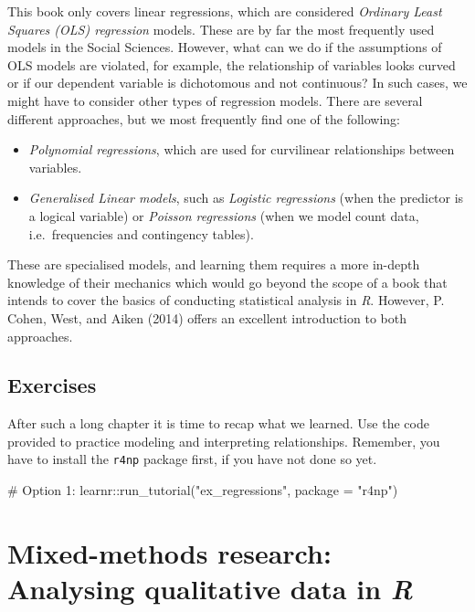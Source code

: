 \documentclass[
  letterpaper,
]{krantz}
\makeatletter
\newenvironment{Shaded}{\begin{snugshade}}{\end{snugshade}}
\newcommand{\AttributeTok}[1]{\textcolor[rgb]{0.40,0.45,0.13}{#1}}
\newcommand{\CommentTok}[1]{\textcolor[rgb]{0.37,0.37,0.37}{#1}}
\newcommand{\FunctionTok}[1]{\textcolor[rgb]{0.28,0.35,0.67}{#1}}
\newcommand{\NormalTok}[1]{\textcolor[rgb]{0.00,0.23,0.31}{#1}}
\newcommand{\SpecialCharTok}[1]{\textcolor[rgb]{0.37,0.37,0.37}{#1}}
\newcommand{\StringTok}[1]{\textcolor[rgb]{0.13,0.47,0.30}{#1}}
\newenvironment{kframe}{%
\medskip{}
\setlength{\fboxsep}{.8em}
 \def\at@end@of@kframe{}%
 \ifinner\ifhmode%
  \def\at@end@of@kframe{\end{minipage}}%
  \begin{minipage}{\columnwidth}%
 \fi\fi%
 \def\FrameCommand##1{\hskip\@totalleftmargin \hskip-\fboxsep
 \colorbox{shadecolor}{##1}\hskip-\fboxsep
     \hskip-\linewidth \hskip-\@totalleftmargin \hskip\columnwidth}%
 \MakeFramed {\advance\hsize-\width
   \@totalleftmargin\z@ \linewidth\hsize
   \@setminipage}}%
 {\par\unskip\endMakeFramed%
 \at@end@of@kframe}
\renewenvironment{Shaded}{\begin{kframe}}{\end{kframe}}
\makeatother
\begin{document}
This book only covers linear regressions, which are considered
\emph{Ordinary Least Squares (OLS) regression} models. These are by far
the most frequently used models in the Social Sciences. However, what
can we do if the assumptions of OLS models are violated, for example,
the relationship of variables looks curved or if our dependent variable
is dichotomous and not continuous? In such cases, we might have to
consider other types of regression models. There are several different
approaches, but we most frequently find one of the following:

\begin{itemize}
\item
  \emph{Polynomial regressions}, which are used for curvilinear
  relationships between variables.
\item
  \emph{Generalised Linear models}, such as \emph{Logistic regressions}
  (when the predictor is a logical variable) or \emph{Poisson
  regressions} (when we model count data, i.e.~frequencies and
  contingency tables).
\end{itemize}

These are specialised models, and learning them requires a more in-depth
knowledge of their mechanics which would go beyond the scope of a book
that intends to cover the basics of conducting statistical analysis in
\emph{R}. However, P. Cohen, West, and Aiken (2014) offers an excellent
introduction to both approaches.

\section{Exercises}\label{sec-exercises-regressions}

After such a long chapter it is time to recap what we learned. Use the
code provided to practice modeling and interpreting relationships.
Remember, you have to install the \texttt{r4np} package first, if you
have not done so yet.

\begin{Shaded}
\begin{Highlighting}[]
\CommentTok{\# Option 1:}
\NormalTok{learnr}\SpecialCharTok{::}\FunctionTok{run\_tutorial}\NormalTok{(}\StringTok{"ex\_regressions"}\NormalTok{, }\AttributeTok{package =} \StringTok{"r4np"}\NormalTok{)}
\end{Highlighting}
\end{Shaded}


\chapter{\texorpdfstring{Mixed-methods research: Analysing qualitative
data in
\emph{R}}{Mixed-methods research: Analysing qualitative data in R}}\label{sec-mixed-methods-research}
\end{document}
